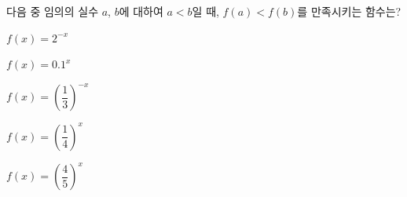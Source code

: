 다음 중 임의의 실수 $a$, $b$에 대하여 $a<b$일 때, $f(a)<f(b)$를 만족시키는 함수는?
\begin{choicesii}{\rule[-3ex]{0pt}{8ex}$f(x)=2^{-x}$}{\rule[-3ex]{0pt}{8ex}$f(x)=0.1^x$}{\rule[-3ex]{0pt}{8ex}$f(x)=\left(\dfrac{1}{3}\right)^{-x}$}{\rule[-3ex]{0pt}{8ex}$f(x)=\left(\dfrac{1}{4}\right)^{x}$}{\rule[-3ex]{0pt}{8ex}$f(x)=\left(\dfrac{4}{5}\right)^{x}$}\end{choicesii}
